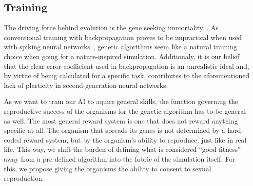 \subsection{Training}
The driving force behind evolution is the gene seeking immortality~\cite{Dawkins1976}.
As conventional training with backpropagation proves to be impractical when used with
spiking neural networks~\cite{Paugam-Moisy2012}, genetic algorithms seem like a natural training choice
when going for a nature-inspired simulation. Additionaly, it is our belief that the clear error
coefficient used in backpropagation is an unrealistic ideal and, by virtue of being calculated for
a specific task, contributes to the aforementioned lack of plasticity in second-generation neural networks.

As we want to train our AI to aquire general skills, the function governing the reproductive success of
the organisms for the genetic algorithm has to be general as well. The most general reward system
is one that does not reward anything specific at all. The organism that spreads its 
genes is not determined by a hard-coded reward system, but by the organism's ability to reproduce, 
just like in real life. This way, we shift the burden of defining what is considered ``good fitness''
away from a pre-defined algorithm into the fabric of the simulation itself.
For this, we propose giving the organisms the ability to consent to sexual reproduction.
